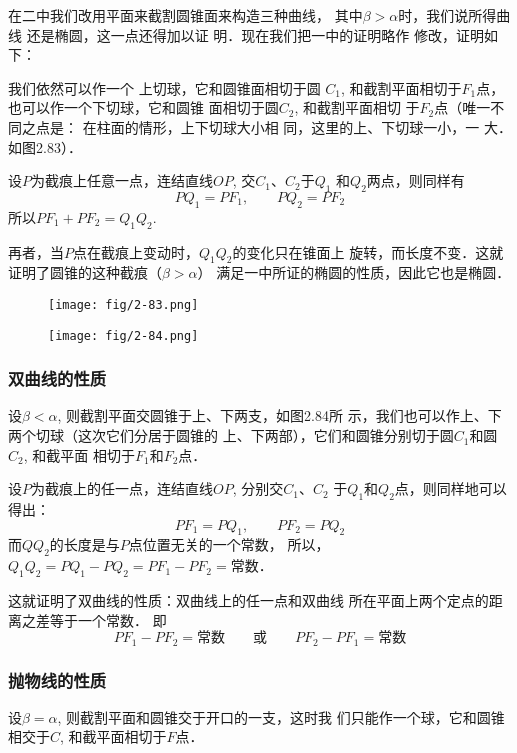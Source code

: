 在二中我们改用平面来截割圆锥面来构造三种曲线，
其中$\beta>\alpha$时，我们说所得曲线
还是椭圆，这一点还得加以证
明．现在我们把一中的证明略作
修改，证明如下：

我们依然可以作一个
上切球，它和圆锥面相切于圆
$C_1$, 和截割平面相切于$F_1$点，
也可以作一个下切球，它和圆锥
面相切于圆$C_2$, 和截割平面相切
于$F_2$点（唯一不同之点是：
在柱面的情形，上下切球大小相
同，这里的上、下切球一小，一
大．如图2.83）．

设$P$为截痕上任意一点，连结直线$OP$, 交$C_1$、$C_2$于$Q_1$
和$Q_2$两点，则同样有
\[PQ_1=PF_1,\qquad PQ_2=PF_2\]
所以$PF_1+PF_2=Q_1Q_2$.

再者，当$P$点在截痕上变动时，$Q_1Q_2$的变化只在锥面上
旋转，而长度不变．这就证明了圆锥的这种截痕（$\beta>\alpha$）
满足一中所证的椭圆的性质，因此它也是椭圆．

\begin{figure}[htp]\centering
    \begin{minipage}[t]{0.48\textwidth}
    \centering
\texttt{[image: fig/2-83.png]}
    \caption{}
    \end{minipage}
    \begin{minipage}[t]{0.48\textwidth}
    \centering
\texttt{[image: fig/2-84.png]}
    \caption{}
    \end{minipage}
    \end{figure}

\subsubsection{双曲线的性质}
设$\beta<\alpha$, 则截割平面交圆锥于上、下两支，如图2.84所
示，我们也可以作上、下两个切球（这次它们分居于圆锥的
上、下两部），它们和圆锥分别切于圆$C_1$和圆$C_2$, 和截平面
相切于$F_1$和$F_2$点．

设$P$为截痕上的任一点，连结直线$OP$, 分别交$C_1$、$C_2$
于$Q_1$和$Q_2$点，则同样地可以得出：
\[PF_1=PQ_1,\qquad PF_2=PQ_2\]
而$QQ_2$的长度是与$P$点位置无关的一个常数，
所以，$Q_1Q_2=PQ_1-PQ_2=PF_1-PF_2=$常数．

这就证明了双曲线的性质：双曲线上的任一点和双曲线
所在平面上两个定点的距离之差等于一个常数．
即
\[PF_1-PF_2=\text{常数}\qquad \text{或}\qquad PF_2-PF_1=\text{常数}\]


\subsubsection{抛物线的性质}
设$\beta=\alpha$, 则截割平面和圆锥交于开口的一支，这时我
们只能作一个球，它和圆锥相交于$C$, 和截平面相切于$F$点．

